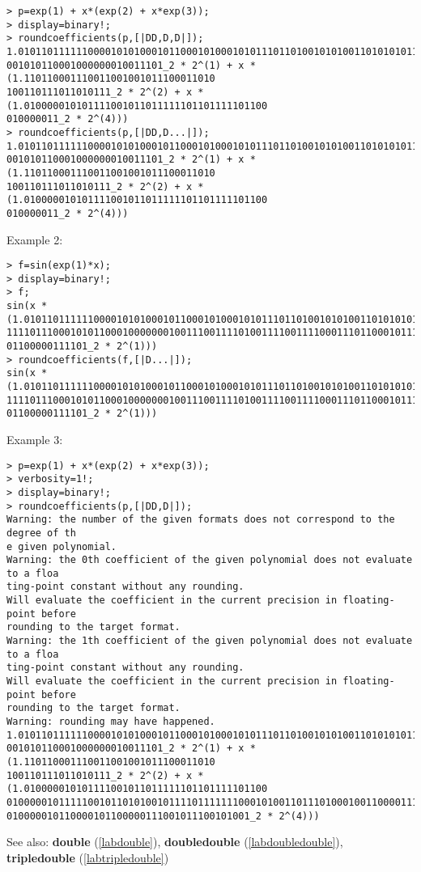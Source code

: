\begin{center}\begin{minipage}{15cm}\begin{Verbatim}[frame=single]
> p=exp(1) + x*(exp(2) + x*exp(3));
> display=binary!;
> roundcoefficients(p,[|DD,D,D|]);
1.010110111111000010101000101100010100010101110110100101010011010101011111101110
001010110001000000010011101_2 * 2^(1) + x * (1.110110001110011001001011100011010
100110111011010111_2 * 2^(2) + x * (1.010000010101111001011011111101101111101100
010000011_2 * 2^(4)))
> roundcoefficients(p,[|DD,D...|]);
1.010110111111000010101000101100010100010101110110100101010011010101011111101110
001010110001000000010011101_2 * 2^(1) + x * (1.110110001110011001001011100011010
100110111011010111_2 * 2^(2) + x * (1.010000010101111001011011111101101111101100
010000011_2 * 2^(4)))
\end{Verbatim}
\end{minipage}\end{center}
\noindent Example 2: 
\begin{center}\begin{minipage}{15cm}\begin{Verbatim}[frame=single]
> f=sin(exp(1)*x);
> display=binary!;
> f;
sin(x * (1.010110111111000010101000101100010100010101110110100101010011010101011
11110111000101011000100000001001110011110100111100111100011101100010111001110001
01100000111101_2 * 2^(1)))
> roundcoefficients(f,[|D...|]);
sin(x * (1.010110111111000010101000101100010100010101110110100101010011010101011
11110111000101011000100000001001110011110100111100111100011101100010111001110001
01100000111101_2 * 2^(1)))
\end{Verbatim}
\end{minipage}\end{center}
\noindent Example 3: 
\begin{center}\begin{minipage}{15cm}\begin{Verbatim}[frame=single]
> p=exp(1) + x*(exp(2) + x*exp(3));
> verbosity=1!;
> display=binary!;
> roundcoefficients(p,[|DD,D|]);
Warning: the number of the given formats does not correspond to the degree of th
e given polynomial.
Warning: the 0th coefficient of the given polynomial does not evaluate to a floa
ting-point constant without any rounding.
Will evaluate the coefficient in the current precision in floating-point before 
rounding to the target format.
Warning: the 1th coefficient of the given polynomial does not evaluate to a floa
ting-point constant without any rounding.
Will evaluate the coefficient in the current precision in floating-point before 
rounding to the target format.
Warning: rounding may have happened.
1.010110111111000010101000101100010100010101110110100101010011010101011111101110
001010110001000000010011101_2 * 2^(1) + x * (1.110110001110011001001011100011010
100110111011010111_2 * 2^(2) + x * (1.010000010101111001011011111101101111101100
01000001011111001011010100101111011111110001010011011101000100110000111010001110
010000010110000101100000111001011100101001_2 * 2^(4)))
\end{Verbatim}
\end{minipage}\end{center}
See also: \textbf{double} (\ref{labdouble}), \textbf{doubledouble} (\ref{labdoubledouble}), \textbf{tripledouble} (\ref{labtripledouble})
